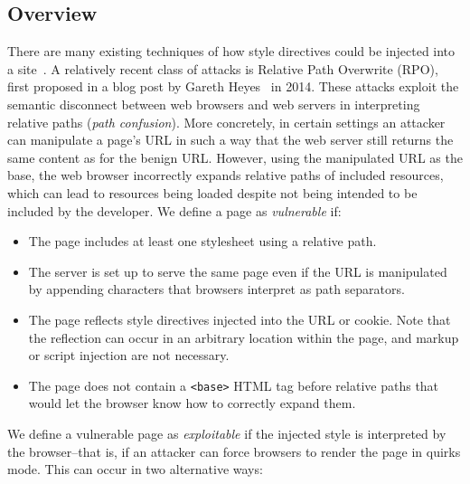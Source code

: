\subsection{Overview}

There are many existing techniques of how style directives could be injected
into a site~\cite{ccs2012scriptless,ccs2010cross_origin_css}. A relatively
recent class of attacks is Relative Path Overwrite (RPO), first proposed in a
blog post by Gareth Heyes~\cite{rpo} in 2014. These attacks exploit the semantic
disconnect between web browsers and web servers in interpreting relative paths
(\textit{path confusion}). More concretely, in certain settings an attacker can
manipulate a page's URL in such a way that the web server still returns the same
content as for the benign URL. However, using the manipulated URL as the base,
the web browser incorrectly expands relative paths of included resources, which
can lead to resources being loaded despite not being intended to be included by
the developer. We define a page as \textit{vulnerable} if:

\begin{itemize}

\item The page includes at least one stylesheet using a relative path.

\item The server is set up to serve the same page even if the URL is manipulated
by appending characters that browsers interpret as path separators.

\item The page reflects style directives injected into the URL or cookie. Note
that the reflection can occur in an arbitrary location within the page, and
markup or script injection are not necessary.

\item The page does not contain a \texttt{<base>} HTML tag before relative paths
that would let the browser know how to correctly expand them.

\end{itemize}

We define a vulnerable page as \textit{exploitable} if the injected style is
interpreted by the browser--that is, if an attacker can force browsers to render
the page in quirks mode. This can occur in two alternative ways:

